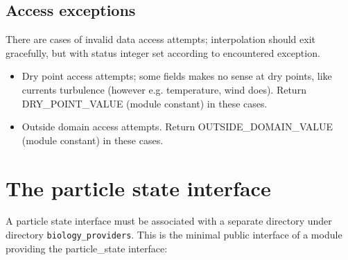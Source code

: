 \subsection{Access exceptions}

There are cases of invalid data access attempts; interpolation should exit gracefully, but
with status integer set according to encountered exception. 

\begin{itemize}

    \item Dry point access attempts; some fields makes no sense at dry points, like currents
          turbulence (however e.g. temperature, wind does). Return DRY\_POINT\_VALUE (module constant)
          in these cases.

    \item Outside domain access attempts. Return OUTSIDE\_DOMAIN\_VALUE (module constant)
          in these cases.

\end{itemize}

\section{The particle state interface}

A particle state interface
must be associated with a separate directory under directory {\tt biology\_providers}.
This is the minimal public interface of a module providing
the particle\_state interface:

